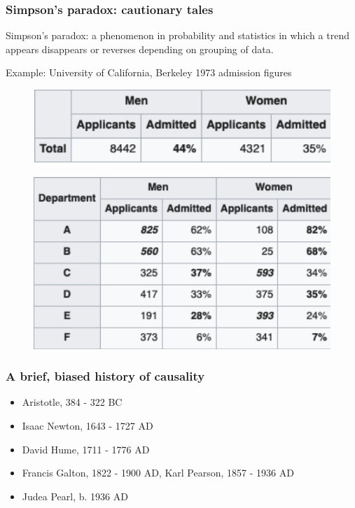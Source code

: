 \begin{frame}
    \frametitle{Simpson's paradox: cautionary tales}
    Simpson's paradox: a phenomenon in probability and statistics in which a trend appears disappears or reverses depending on grouping of data. \cite{simpson-wikipedia} \newline
    
    Example: University of California, Berkeley 1973 admission figures\newline
    
    \begin{figure}[ht]
        \includegraphics[height=0.15\textheight]{graphics/berkeley}\newline
        \cite{freedman1998statistics}
    \end{figure}
    \begin{figure}[ht]
        \includegraphics[height=0.3\textheight]{graphics/berkeley_later}\newline
        \cite{Bickel398}
    \end{figure}
    
\end{frame}


\begin{frame}
\frametitle{A brief, biased history of causality}
\begin{itemize}
\item Aristotle, 384 - 322 BC
\item Isaac Newton, 1643 - 1727 AD
\item David Hume, 1711 - 1776 AD
\item Francis Galton, 1822 - 1900 AD, Karl Pearson, 1857 - 1936 AD
\item Judea Pearl, b. 1936 AD
\end{itemize}
\end{frame}



